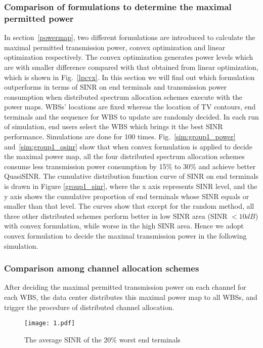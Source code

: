 \subsubsection*{Comparison of formulations to determine the maximal permitted power}
In section~\ref{powermap}, two different formulations are introduced to calculate the maximal permitted transmission power, \ie convex optimization and linear optimization respectively.
The convex optimization generates power levels which are with smaller difference compared with that obtained from linear optimization, which is shown in Fig.~\ref{lpcvx}.
In this section we will find out which formulation outperforms in terms of SINR on end terminals and transmission power consumption when distributed spectrum allocation schemes execute with the power maps.
WBSs' locations are fixed whereas the location of TV contours, end terminals and the sequence for WBS to update are randomly decided.
In each run of simulation, end users select the WBS which brings it the best SINR performance.
Simulations are done for 100 times.
Fig.~\ref{sim:group1_power} and~\ref{sim:group1_qsinr} show that when convex formulation is applied to decide the maximal power map, all the four distributed spectrum allocation schemes consume less transmission power consumption by 15\% to 30\% and achieve better QuasiSINR. 
The cumulative distribution function curve of SINR on end terminals is drawn in Figure \ref{group1_sinr}, where the x axis represents SINR level, and the y axis shows the cumulative proportion of end terminals whose SINR equals or smaller than that level. 
The curves show that except for the random method, all three other distributed schemes perform better in low SINR area (SINR $<10 dB$) with convex formulation, while worse in the high SINR area. 
Hence we adopt convex formulation to decide the maximal transmission power in the following simulation.


\subsubsection*{Comparison among channel allocation schemes }
After deciding the maximal permitted transmission power on each channel for each WBS, the data center distributes this maximal power map to all WBSs, and trigger the procedure of distributed channel allocation. 
\begin{figure}[h!]
  \centering
  \texttt{[image: 1.pdf]}
  \caption{The average SINR of the 20\% worst end terminals}
\label{group1_worst20sinr}
\end{figure}


